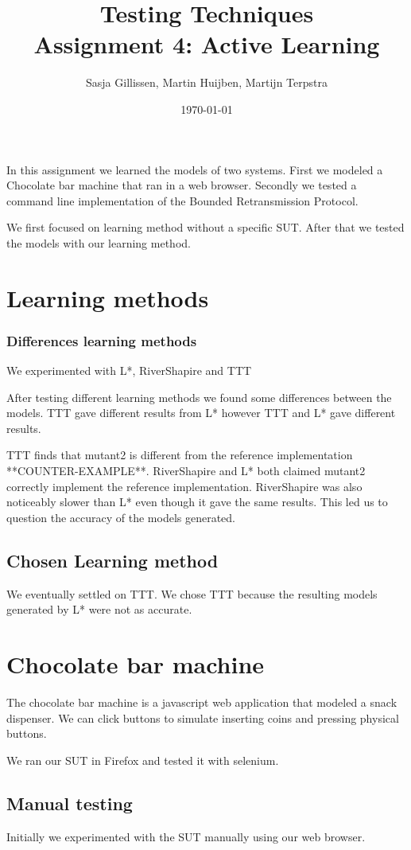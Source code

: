 \documentclass[11pt,a4paper]{article}
\author{Sasja Gillissen, Martin Huijben, Martijn Terpstra}
\date{\today}
\title{Testing Techniques\\
  \textbf{Assignment 4: Active Learning}}
\begin{document}
\maketitle

In this assignment we learned the models of two systems. First we
modeled a Chocolate bar machine that ran in a web browser. Secondly we
tested a command line implementation of the Bounded Retransmission Protocol.

We first focused on learning method without a specific SUT. After that
we tested the models with our learning method.

\section{Learning methods}
\subsubsection{Differences learning methods}
We experimented with L*, RiverShapire and TTT

After testing different learning methods we found some differences
between the models. TTT gave different results from L* however TTT and
L* gave different results.

TTT finds that mutant2 is different from the reference implementation
**COUNTER-EXAMPLE**. RiverShapire and L* both claimed mutant2
correctly implement the reference implementation. RiverShapire was
also noticeably slower than L* even though it gave the same results.
This led us to question the accuracy of the models generated.

\subsection{Chosen Learning method}
We eventually settled on TTT. We chose TTT because the resulting
models generated by L* were not as accurate.


\section{Chocolate bar machine}
The chocolate bar machine is a javascript web application that modeled
a snack dispenser. We can click buttons to simulate inserting coins
and pressing physical buttons.

We ran our SUT in Firefox and tested it with selenium.

\subsection{Manual testing}
Initially we experimented with the SUT manually using our web browser.
\end{document}
